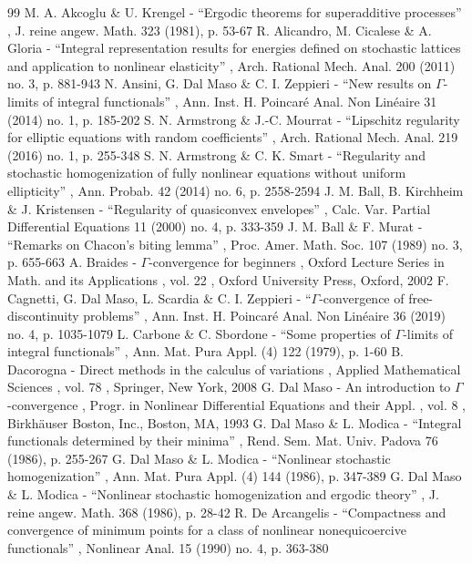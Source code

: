 \documentclass[11pt]{article}
\numberwithin{equation}{section}
\theoremstyle{definition}
\begin{document}
\begin{thebibliography}{99}
 M. A. Akcoglu \& U. Krengel - “Ergodic theorems for superadditive processes” , J. reine angew. Math. 323 (1981), p. 53-67
 R. Alicandro, M. Cicalese \& A. Gloria - “Integral representation results for energies defined on stochastic lattices and application to nonlinear elasticity” , Arch. Rational Mech. Anal. 200 (2011) no. 3, p. 881-943
 N. Ansini, G. Dal Maso \& C. I. Zeppieri - “New results on $\Gamma $-limits of integral functionals” , Ann. Inst. H. Poincaré Anal. Non Linéaire 31 (2014) no. 1, p. 185-202
 S. N. Armstrong \& J.-C. Mourrat - “Lipschitz regularity for elliptic equations with random coefficients” , Arch. Rational Mech. Anal. 219 (2016) no. 1, p. 255-348
 S. N. Armstrong \& C. K. Smart - “Regularity and stochastic homogenization of fully nonlinear equations without uniform ellipticity” , Ann. Probab. 42 (2014) no. 6, p. 2558-2594
 J. M. Ball, B. Kirchheim \& J. Kristensen - “Regularity of quasiconvex envelopes” , Calc. Var. Partial Differential Equations 11 (2000) no. 4, p. 333-359
 J. M. Ball \& F. Murat - “Remarks on Chacon’s biting lemma” , Proc. Amer. Math. Soc. 107 (1989) no. 3, p. 655-663
 A. Braides - $\Gamma $-convergence for beginners , Oxford Lecture Series in Math. and its Applications , vol. 22 , Oxford University Press, Oxford, 2002
 F. Cagnetti, G. Dal Maso, L. Scardia \& C. I. Zeppieri - “$\Gamma $-convergence of free-discontinuity problems” , Ann. Inst. H. Poincaré Anal. Non Linéaire 36 (2019) no. 4, p. 1035-1079
 L. Carbone \& C. Sbordone - “Some properties of $\Gamma $-limits of integral functionals” , Ann. Mat. Pura Appl. (4) 122 (1979), p. 1-60
 B. Dacorogna - Direct methods in the calculus of variations , Applied Mathematical Sciences , vol. 78 , Springer, New York, 2008
 G. Dal Maso - An introduction to $\Gamma $-convergence , Progr. in Nonlinear Differential Equations and their Appl. , vol. 8 , Birkhäuser Boston, Inc., Boston, MA, 1993
 G. Dal Maso \& L. Modica - “Integral functionals determined by their minima” , Rend. Sem. Mat. Univ. Padova 76 (1986), p. 255-267
 G. Dal Maso \& L. Modica - “Nonlinear stochastic homogenization” , Ann. Mat. Pura Appl. (4) 144 (1986), p. 347-389
 G. Dal Maso \& L. Modica - “Nonlinear stochastic homogenization and ergodic theory” , J. reine angew. Math. 368 (1986), p. 28-42
 R. De Arcangelis - “Compactness and convergence of minimum points for a class of nonlinear nonequicoercive functionals” , Nonlinear Anal. 15 (1990) no. 4, p. 363-380

\end{thebibliography}
\end{document}
